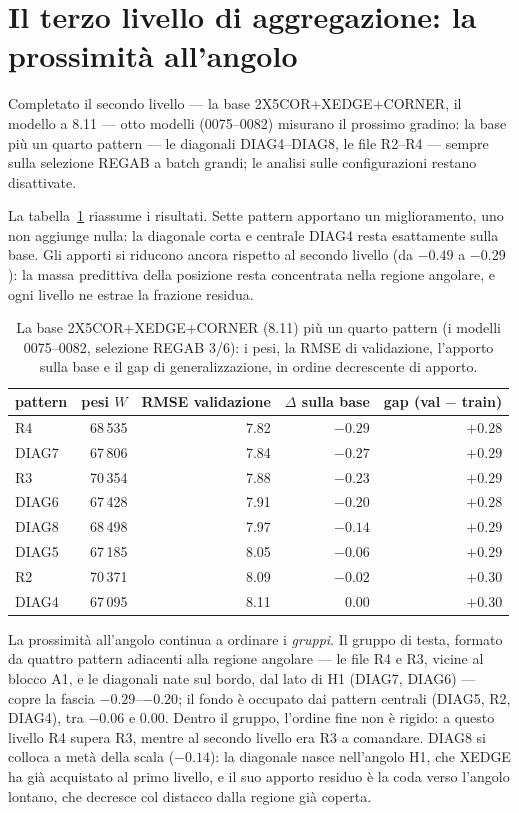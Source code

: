 \section{Il terzo livello di aggregazione: la prossimità
all'angolo}

Completato il secondo livello — la base 2X5COR+XEDGE+CORNER, il
modello a 8.11 — otto modelli (0075--0082) misurano il prossimo
gradino: la base più un quarto pattern — le diagonali
DIAG4--DIAG8, le file R2--R4 — sempre sulla selezione REGAB a batch
grandi; le analisi sulle configurazioni restano disattivate.

La tabella~\ref{tab:feature-base-pattern-terzo-livello} riassume i
risultati. Sette pattern apportano un miglioramento, uno non
aggiunge nulla: la diagonale corta e centrale DIAG4 resta
esattamente sulla base. Gli apporti si riducono ancora rispetto al
secondo livello (da $-0.49$ a $-0.29$): la massa predittiva della
posizione resta concentrata nella regione angolare, e ogni livello
ne estrae la frazione residua.

\begin{table}[ht]
\centering
\begin{tabular}{lrrrr}
\toprule
pattern & pesi $W$ & RMSE validazione & $\Delta$ sulla base & gap (val $-$ train) \\
\midrule
R4     & 68\,535 & 7.82 & $-0.29$ & $+0.28$ \\
DIAG7  & 67\,806 & 7.84 & $-0.27$ & $+0.29$ \\
R3     & 70\,354 & 7.88 & $-0.23$ & $+0.29$ \\
DIAG6  & 67\,428 & 7.91 & $-0.20$ & $+0.28$ \\
DIAG8  & 68\,498 & 7.97 & $-0.14$ & $+0.29$ \\
DIAG5  & 67\,185 & 8.05 & $-0.06$ & $+0.29$ \\
R2     & 70\,371 & 8.09 & $-0.02$ & $+0.30$ \\
DIAG4  & 67\,095 & 8.11 & $0.00$  & $+0.30$ \\
\bottomrule
\end{tabular}
\caption{La base 2X5COR+XEDGE+CORNER (8.11) più un quarto pattern
(i modelli 0075--0082, selezione REGAB 3/6): i pesi, la RMSE di
validazione, l'apporto sulla base e il gap di generalizzazione, in
ordine decrescente di apporto.}
\label{tab:feature-base-pattern-terzo-livello}
\end{table}

La prossimità all'angolo continua a ordinare i \emph{gruppi}. Il
gruppo di testa, formato da quattro pattern adiacenti alla regione
angolare — le file R4 e R3, vicine al blocco A1, e le diagonali
nate sul bordo, dal lato di H1 (DIAG7, DIAG6) — copre la fascia
$-0.29$--$-0.20$; il fondo è occupato dai pattern centrali (DIAG5,
R2, DIAG4), tra $-0.06$ e $0.00$. Dentro il gruppo, l'ordine fine
non è rigido: a questo livello R4 supera R3, mentre al secondo
livello era R3 a comandare. DIAG8 si colloca a metà della scala
($-0.14$): la diagonale nasce nell'angolo H1, che XEDGE ha già
acquistato al primo livello, e il suo apporto residuo è la coda
verso l'angolo lontano, che decresce col distacco dalla regione già
coperta.

